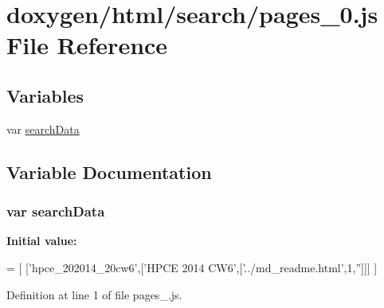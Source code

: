 \hypertarget{a00100}{}\section{doxygen/html/search/pages\+\_\+0.js File Reference}
\label{a00100}
\subsection*{Variables}
\begin{DoxyCompactItemize}
\item 
var \hyperlink{a00100_ad01a7523f103d6242ef9b0451861231e}{search\+Data}
\end{DoxyCompactItemize}


\subsection{Variable Documentation}
\hypertarget{a00100_ad01a7523f103d6242ef9b0451861231e}{}
\subsubsection[{search\+Data}]{\setlength{\rightskip}{0pt plus 5cm}var search\+Data}\label{a00100_ad01a7523f103d6242ef9b0451861231e}
{\bfseries Initial value\+:}
\begin{DoxyCode}
=
[
  [\textcolor{stringliteral}{'hpce\_202014\_20cw6'},[\textcolor{stringliteral}{'HPCE 2014 CW6'},[\textcolor{stringliteral}{'../md\_readme.html'},1,\textcolor{stringliteral}{''}]]]
]
\end{DoxyCode}


Definition at line 1 of file pages\+\_.\+js.

